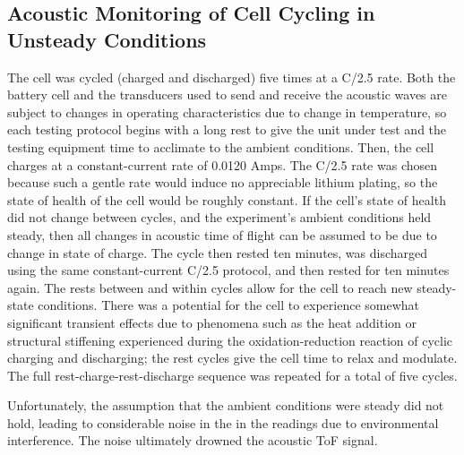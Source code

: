 \subsection{Acoustic Monitoring of Cell Cycling in Unsteady Conditions}

The cell was cycled (charged and discharged) five times at a C/2.5 rate. 
Both the battery cell and the transducers used to send and receive the acoustic waves are subject to changes in operating characteristics due to change in temperature, so each testing protocol begins with a long rest to give the unit under test and the testing equipment time to acclimate to the ambient conditions. 
Then, the cell charges at a constant-current rate of 0.0120 Amps. 
The C/2.5 rate was chosen because such a gentle rate would induce no appreciable lithium plating, so the state of health of the cell would be roughly constant. 
If the cell's state of health did not change between cycles, and the experiment's ambient conditions held steady, then all changes in acoustic time of flight can be assumed to be due to change in state of charge.
The cycle then rested ten minutes, was discharged using the same constant-current C/2.5 protocol, and then rested for ten minutes again. 
The rests between and within cycles allow for the cell to reach new steady-state conditions. 
There was a potential for the cell to experience somewhat significant transient effects due to phenomena such as the heat addition or structural stiffening experienced during the oxidation-reduction reaction of cyclic charging and discharging; the rest cycles give the cell time to relax and modulate.
The full rest-charge-rest-discharge sequence was repeated for a total of five cycles.

Unfortunately, the assumption that the ambient conditions were steady did not hold, leading to considerable noise in the in the readings due to environmental interference. The noise ultimately drowned the acoustic ToF signal.

